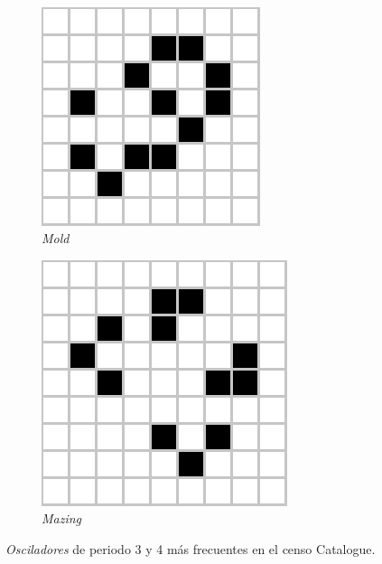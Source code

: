 \documentclass[../proyecto.tex]{memoir}
\begin{document}
\begin{figure}[H]
\begin{subfigure}[b]{0.3\linewidth}
    \end{subfigure}
    \\
	\begin{subfigure}[b]{0.3\linewidth} 
        \centering
        \includegraphics[height=0.65\linewidth]{./images/mold.png}
        \caption{\textit{Mold}}
        \label{fig:mold}
    \end{subfigure}
    \quad
	\begin{subfigure}[b]{0.3\linewidth} 
        \centering
        \includegraphics[height=0.65\linewidth]{./images/mazing.png}
        \caption{\textit{Mazing}}
        \label{fig:mazing}
    \end{subfigure}
	\caption{\textit{Osciladores} de periodo 3 y 4 más frecuentes en el censo {Catalogue}.}
	\label{fig:toposciladores}
\end{figure} 
\end{document}
